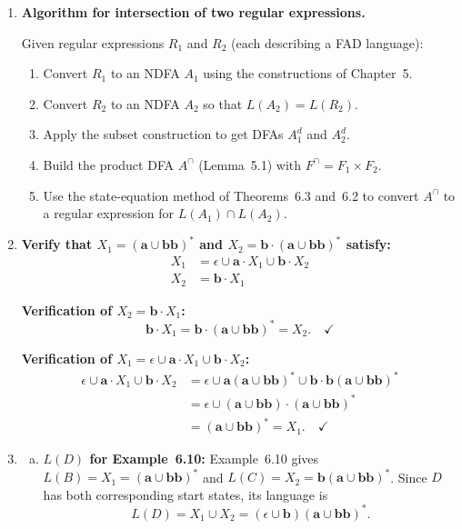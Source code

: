\begin{enumerate}[{6.}1.]
\item \textbf{Algorithm for intersection of two regular expressions.}

Given regular expressions $R_1$ and $R_2$ (each describing a FAD language):
\begin{enumerate}[1.]
  \item Convert $R_1$ to an NDFA $A_1$ using the constructions of Chapter~5.
  \item Convert $R_2$ to an NDFA $A_2$ so that $L(A_2)=L(R_2)$.
  \item Apply the subset construction to get DFAs $A_1^d$ and $A_2^d$.
  \item Build the product DFA $A^\cap$ (Lemma~5.1) with $F^\cap=F_1\times F_2$.
  \item Use the state-equation method of Theorems~6.3 and~6.2 to convert $A^\cap$ to a regular expression for $L(A_1)\cap L(A_2)$.
\end{enumerate}

\item \textbf{Verify that $X_1=(\pmb{a}\cup\pmb{bb})^*$ and $X_2=\pmb{b}\cdot(\pmb{a}\cup\pmb{bb})^*$ satisfy:}
\begin{align*}
  X_1 &= \epsilon\cup\pmb{a}\cdot X_1\cup\pmb{b}\cdot X_2 \\
  X_2 &= \pmb{b}\cdot X_1
\end{align*}

\textbf{Verification of $X_2=\pmb{b}\cdot X_1$:}
\[
  \pmb{b}\cdot X_1 = \pmb{b}\cdot(\pmb{a}\cup\pmb{bb})^* = X_2. \quad\checkmark
\]

\textbf{Verification of $X_1=\epsilon\cup\pmb{a}\cdot X_1\cup\pmb{b}\cdot X_2$:}
\begin{align*}
  \epsilon\cup\pmb{a}\cdot X_1\cup\pmb{b}\cdot X_2
    &= \epsilon\cup\pmb{a}(\pmb{a}\cup\pmb{bb})^*\cup\pmb{b}\cdot\pmb{b}(\pmb{a}\cup\pmb{bb})^* \\
    &= \epsilon\cup(\pmb{a}\cup\pmb{bb})\cdot(\pmb{a}\cup\pmb{bb})^* \\
    &= (\pmb{a}\cup\pmb{bb})^* = X_1. \quad\checkmark
\end{align*}

\item \begin{enumerate}[(a)]
  \item \textbf{$L(D)$ for Example~6.10:}  Example~6.10 gives
  $L(B)=X_1=(\pmb{a}\cup\pmb{bb})^*$ and
  $L(C)=X_2=\pmb{b}(\pmb{a}\cup\pmb{bb})^*$.  Since $D$ has both corresponding
  start states, its language is
  \[
    L(D)=X_1\cup X_2
    =(\epsilon\cup\pmb{b})(\pmb{a}\cup\pmb{bb})^*.
  \]


\end{enumerate}
\end{enumerate}
